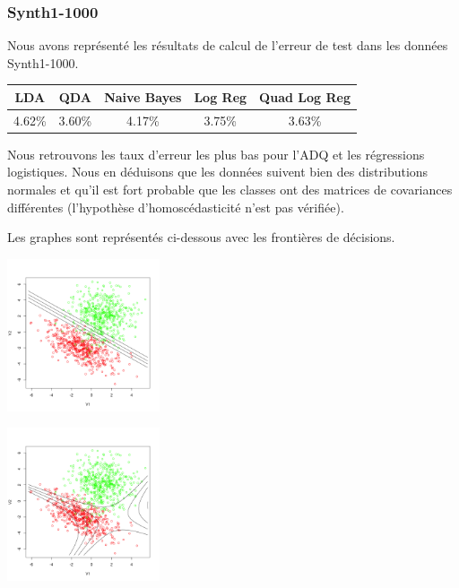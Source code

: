\documentclass[10pt]{article}
\begin{document}
\subsubsection{Synth1-1000}
Nous avons représenté les résultats de calcul de l'erreur de test dans les données Synth1-1000. 
\begin{center}
	\begin{tabular}{|c | c | c| c| c| }
		\hline
		LDA & QDA & Naive Bayes & Log Reg & Quad Log Reg\\
		\hline	
		4.62\% & 3.60\% & 4.17\% & 3.75\% & 3.63\%
	\end{tabular}
\end{center}
Nous retrouvons les taux d'erreur les plus bas pour l'ADQ et les régressions logistiques. Nous en déduisons que les données suivent bien des distributions normales et qu'il est fort probable que les classes ont des matrices de covariances différentes (l'hypothèse d'homoscédasticité n'est pas vérifiée). 

Les graphes sont représentés ci-dessous avec les frontières de décisions.

\begin{minipage}{.5\textwidth}
	\includegraphics[width=45mm]{Figures/synth1_lda.png}
\end{minipage}%
\hspace{0.02\linewidth}
\begin{minipage}{.5\textwidth}
	\includegraphics[width=45mm]{Figures/synth1_qda.png}
\end{minipage}
\end{document}
